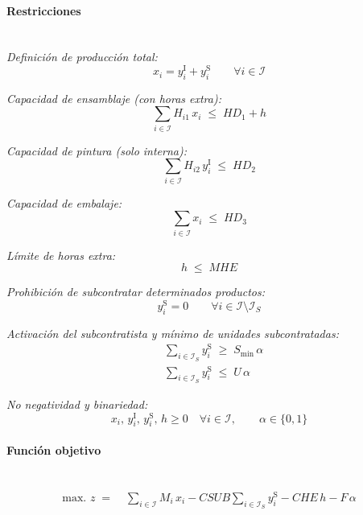 \paragraph{Restricciones}\mbox{}\\

\textit{Definición de producción total:}
\begin{equation}
x_i = y_i^{\mathrm{I}} + y_i^{\mathrm{S}} \qquad \forall i \in \mathcal{I}
\end{equation}

\textit{Capacidad de ensamblaje (con horas extra):}
\begin{equation}
\sum_{i \in \mathcal{I}} H_{i1}\,x_i \;\leq\; HD_1 + h
\end{equation}

\textit{Capacidad de pintura (solo interna):}
\begin{equation}
\sum_{i \in \mathcal{I}} H_{i2}\,y_i^{\mathrm{I}} \;\leq\; HD_2
\end{equation}

\textit{Capacidad de embalaje:}
\begin{equation}
\sum_{i \in \mathcal{I}} x_i \;\leq\; HD_3
\end{equation}

\textit{Límite de horas extra:}
\begin{equation}
h \;\leq\; MHE
\end{equation}

\textit{Prohibición de subcontratar determinados productos:}
\begin{equation}
y_i^{\mathrm{S}} = 0 \qquad \forall i \in \mathcal{I} \setminus \mathcal{I}_S
\end{equation}

\textit{Activación del subcontratista y mínimo de unidades subcontratadas:}
\begin{align}
& \sum_{i \in \mathcal{I}_S} y_i^{\mathrm{S}} \;\geq\; S_{\min}\,\alpha \\
& \sum_{i \in \mathcal{I}_S} y_i^{\mathrm{S}} \;\leq\; U\,\alpha
\end{align}

\textit{No negatividad y binariedad:}
\begin{equation}
x_i,\, y_i^{\mathrm{I}},\, y_i^{\mathrm{S}},\, h \geq 0 \quad \forall i \in \mathcal{I}, 
\qquad \alpha \in \{0,1\}
\end{equation}

\paragraph{Función objetivo}\mbox{}\\
\begin{align}
\mbox{max. } z \;=\;& 
\sum_{i \in \mathcal{I}} M_i\,x_i
- CSUB \sum_{i \in \mathcal{I}_S} y_i^{\mathrm{S}}
- CHE\,h
- F\,\alpha
\end{align}

